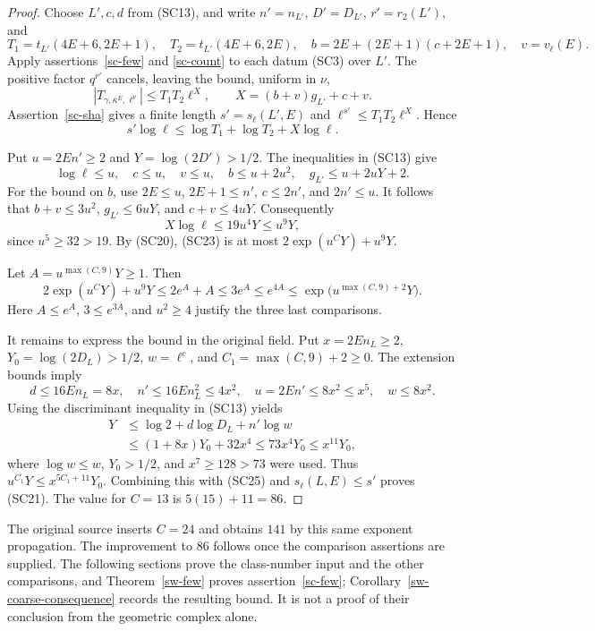\begin{proof}
Choose $L',c,d$ from (SC13), and write
$n'=n_{L'}$, $D'=D_{L'}$, $r'=r_2(L')$, and
\[
 T_1=t_{L'}(4E+6,2E+1),\quad
 T_2=t_{L'}(4E+6,2E),\quad
 b=2E+(2E+1)(c+2E+1),\quad
 v=v_\ell(E).
\]
Apply assertions~\ref{sc-few} and \ref{sc-count} to
each datum (SC3) over $L'$.  The positive factor $q^{r'}$
cancels, leaving the bound, uniform in $\nu$,
\[
                |T_{\gamma,\kappa^E,\ell^\nu}|
                         \le T_1T_2\ell^X,
              \qquad X=(b+v)g_{L'}+c+v.
 \tag{SC22}
\]
Assertion~\ref{sc-sha} gives a finite length $s'=s_\ell(L',E)$
and $\ell^{s'}\le T_1T_2\ell^X$.  Hence
\[
           s'\log\ell\le\log T_1+\log T_2+X\log\ell.
           \tag{SC23}
\]

Put $u=2En'\ge2$ and $Y=\log(2D')>1/2$.
The inequalities in (SC13) give
\[
 \log\ell\le u,\quad c\le u,\quad v\le u,\quad
 b\le u+2u^2,\quad
 g_{L'}\le u+2uY+2.
\]
For the bound on $b$, use $2E\le u$,
$2E+1\le n'$, $c\le2n'$, and $2n'\le u$.
It follows that
$b+v\le3u^2$, $g_{L'}\le6uY$, and $c+v\le4uY$.
Consequently
\[
                  X\log\ell\le19u^4Y\le u^9Y,
                  \tag{SC24}
\]
since $u^5\ge32>19$.
By (SC20), (SC23) is at most
$2\exp(u^CY)+u^9Y$.

Let $A=u^{\max(C,9)}Y\ge1$.  Then
\[
 2\exp(u^CY)+u^9Y
       \le2e^A+A\le3e^A\le e^{4A}
       \le\exp\bigl(u^{\max(C,9)+2}Y\bigr).
 \tag{SC25}
\]
Here $A\le e^A$, $3\le e^{3A}$, and $u^2\ge4$
justify the three last comparisons.

It remains to express the bound in the original field.
Put $x=2E n_L\ge2$, $Y_0=\log(2D_L)>1/2$,
$w=\ell^c$, and $C_1=\max(C,9)+2\ge0$.
The extension bounds imply
\[
 d\le16E n_L=8x,\quad
 n'\le16E n_L^2\le4x^2,\quad
 u=2En'\le8x^2\le x^5,\quad w\le8x^2.
\]
Using the discriminant inequality in (SC13) yields
\[
 \begin{split}
 Y&\le\log2+d\log D_L+n'\log w\\
  &\le(1+8x)Y_0+32x^4
   \le73x^4Y_0
   \le x^{11}Y_0,
 \end{split}
\]
where $\log w\le w$, $Y_0>1/2$, and $x^7\ge128>73$
were used.  Thus $u^{C_1}Y\le x^{5C_1+11}Y_0$.
Combining this with (SC25) and
$s_\ell(L,E)\le s'$ proves (SC21).
The value for $C=13$ is $5(15)+11=86$.
\end{proof}

The original source inserts $C=24$ and obtains $141$
by this same exponent propagation.  The improvement to
$86$ follows once the comparison assertions are supplied.
The following sections prove the class-number input and the
other comparisons, and Theorem~\ref{sw-few} proves
assertion~\ref{sc-few}; Corollary~\ref{sw-coarse-consequence}
records the resulting bound.
It is not a proof of their conclusion from the geometric
complex alone.



